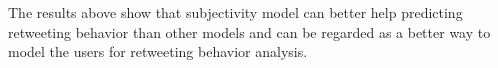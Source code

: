 \documentclass{acm_proc_article-sp}
\begin{document}
The results above show that subjectivity model can better help predicting retweeting behavior than other models and can be regarded as a better way to model the users for retweeting behavior analysis. 
%
\end{document}
